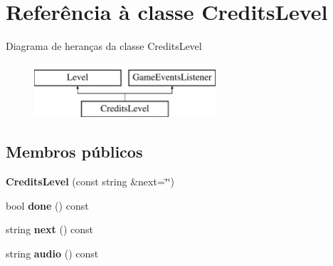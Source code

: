\hypertarget{classCreditsLevel}{}\section{Referência à classe Credits\+Level}
\label{classCreditsLevel}
Diagrama de heranças da classe Credits\+Level\begin{figure}[H]
\begin{center}
\leavevmode
\includegraphics[height=2.000000cm]{classCreditsLevel}
\end{center}
\end{figure}
\subsection*{Membros públicos}
\begin{DoxyCompactItemize}
\item 
\mbox{\label{classCreditsLevel_a2516ba82d10b2eb959d03eea3df0a32c}} 
{\bfseries Credits\+Level} (const string \&next=\char`\"{}\char`\"{})
\item 
\mbox{\label{classCreditsLevel_a80b93759949ba662627b52d0a51325ce}} 
bool {\bfseries done} () const
\item 
\mbox{\label{classCreditsLevel_ad8c392e8e0175052a4451481bddaddfe}} 
string {\bfseries next} () const
\item 
\mbox{\label{classCreditsLevel_a6bf8924562bb2ce7f8b85c35a9b8a52e}} 
string {\bfseries audio} () const
\end{DoxyCompactItemize}

